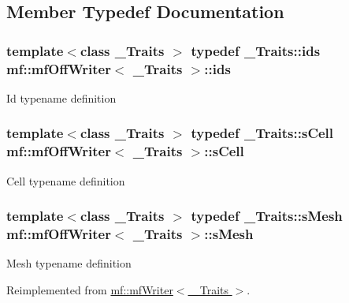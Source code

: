 \subsection{Member Typedef Documentation}
\hypertarget{classmf_1_1mfOffWriter_ab4a116099ef81a112f35ab9d7d74a998}{
\subsubsection[{ids}]{\setlength{\rightskip}{0pt plus 5cm}template$<$class \_\-Traits $>$ typedef \_\-Traits::ids {\bf mf::mfOffWriter}$<$ \_\-Traits $>$::{\bf ids}}}
\label{classmf_1_1mfOffWriter_ab4a116099ef81a112f35ab9d7d74a998}
Id typename definition \hypertarget{classmf_1_1mfOffWriter_a310a1b7e2284f9d36c931bf47695b980}{
\subsubsection[{sCell}]{\setlength{\rightskip}{0pt plus 5cm}template$<$class \_\-Traits $>$ typedef \_\-Traits::sCell {\bf mf::mfOffWriter}$<$ \_\-Traits $>$::{\bf sCell}}}
\label{classmf_1_1mfOffWriter_a310a1b7e2284f9d36c931bf47695b980}
Cell typename definition \hypertarget{classmf_1_1mfOffWriter_a5dee9306e438bf1819fb9823f6123b5c}{
\subsubsection[{sMesh}]{\setlength{\rightskip}{0pt plus 5cm}template$<$class \_\-Traits $>$ typedef \_\-Traits::sMesh {\bf mf::mfOffWriter}$<$ \_\-Traits $>$::{\bf sMesh}}}
\label{classmf_1_1mfOffWriter_a5dee9306e438bf1819fb9823f6123b5c}
Mesh typename definition 

Reimplemented from \hyperlink{classmf_1_1mfWriter}{mf::mfWriter$<$ \_\-Traits $>$}.

